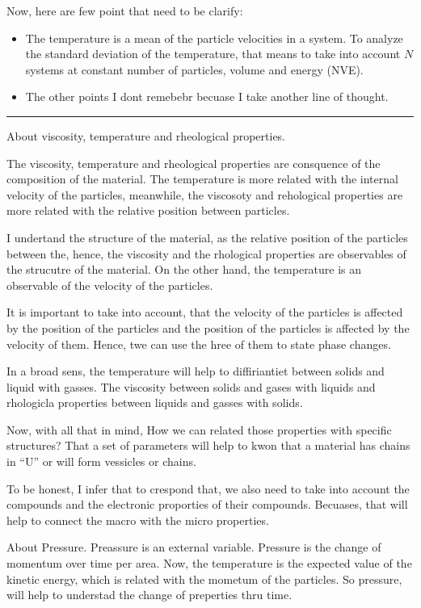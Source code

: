 \documentclass[a4paper, 11pt, oneside]{researchjournal} %
\begin{document}
Now, here are few point that need to be clarify:
\begin{itemize}
	\item The temperature is a mean of the particle velocities in a system. To analyze the standard deviation of the temperature, that means to take into account $N$ systems at constant number of particles, volume and energy (NVE).
	\item The other points I dont remebebr becuase I take another line of thought.
\end{itemize}

\rule{\textwidth}{0.4pt}

About viscosity, temperature and rheological properties.

The viscosity, temperature and rheological properties are consquence of the composition of the material.
The temperature is more related with the internal velocity of the particles, meanwhile, the viscosoty and rehological properties are more related with the relative position between particles.

I undertand the structure of the material, as the relative position of the particles between the, hence, the viscosity and the rhological properties are observables of the strucutre of the material.
On the other hand, the temperature is an observable of the velocity of the particles.

It is important to take into account, that the velocity of the particles is affected by the position of the particles and the position of the particles is affected by the velocity of them.
Hence, twe can use the hree of them to state phase changes.

In a broad sens, the temperature will help to diffiriantiet between solids and liquid with gasses.
The viscosity between solids and gases with liquids and rhologicla properties between liquids and gasses with solids.

Now, with all that in mind, How we can related those properties with specific structures?
That a set of parameters will help to kwon that a material has chains in ``U'' or will form vessicles or chains.

To be honest, I infer that to crespond that, we also need to take into account the compounds and the electronic proporties of their compounds.
Becuases, that will help to connect the macro with the micro properties.

About Pressure.
Preassure is an external variable.
Pressure is the change of momentum over time per area.
Now, the temperature is the expected value of the kinetic energy, which is related with the mometum of the particles.
So pressure, will help to understad the change of preperties thru time.
\end{document}

